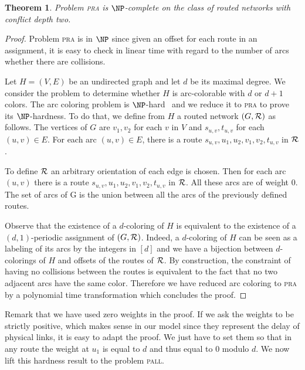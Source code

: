 \documentclass[10pt, conference, letterpaper]{IEEEtran}
\newtheorem{theorem}{Theorem}
\newcommand\pall{\textsc{pall}\xspace}
\newcommand\pra{\textsc{pra}\xspace}
\begin{document}
 \begin{theorem}
Problem \pra is $\NP$-complete on the class of routed networks with conflict depth two.
\end{theorem}
 \begin{proof}
 Problem \pra is in $\NP$ since given an offset for each route in an assignment, it is easy to check in linear time with regard to the number of arcs whether there are collisions.
 
  Let $H=(V,E)$ be an undirected graph and let $d$ be its maximal degree. We consider the problem to determine whether $H$ is arc-colorable  with $d$ or $d+1$ colors. The arc coloring problem is $\NP$-hard~\cite{holyer1981np} and we reduce it to \pra to prove its $\NP$-hardness. To do that, we define from $H$ a routed network $(G,{\cal R})$ as follows.
  The vertices of $G$ are $v_1, v_2$ for each $v$ in $V$ and $s_{u,v}, t_{u,v}$ for each $(u,v) \in E$.
  For each arc $(u,v) \in E$, there is a route $s_{u,v},u_1,u_2,v_1,v_2,t_{u,v}$ in ${\cal R}$. 
  
   To define ${\cal R}$ an arbitrary orientation of each edge is chosen. 
   Then for each arc $(u,v)$ there is a route $s_{u,v},u_1,u_2,v_1,v_2,t_{u,v}$ in ${\cal R}$.
  All these arcs are of weight $0$. The set of arcs of G is the union between all the arcs of the previously defined routes.
   
  Observe that the existence of a $d$-coloring of $H$ is equivalent to the existence of a $(d,1)$-periodic assignment
  of $(G,{\cal R})$. Indeed, a $d$-coloring of $H$ can be seen as a labeling of its arcs by the integers
  in $[d]$ and we have a bijection between $d$-colorings of $H$ and offsets of the routes of ${\cal R}$.
  By construction, the constraint of having no collisions between the routes is equivalent to the fact that no two adjacent arcs have the same color. Therefore we have reduced arc coloring to \pra by a polynomial time transformation which concludes the proof. 
 \end{proof}
 
 Remark that we have used zero weights in the proof. If we ask the weights to be strictly positive, which makes sense in our model since they represent the delay of physical links, it is easy to adapt the proof. We just have to set them so that in any route the weight at $u_1$ is equal to $d$ and thus equal to $0$ modulo $d$. We now lift this hardness result to the problem \pall.
\end{document}
